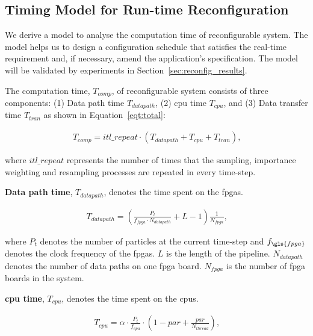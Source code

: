 \subsection{Timing Model for Run-time Reconfiguration}
\label{sec:reconfig_reconfig}

We derive a model to analyse the computation time of reconfigurable system.
The model helps us to design a configuration schedule that satisfies the real-time requirement and, if necessary, amend the application's specification.
The model will be validated by experiments in Section~\ref{sec:reconfig_results}.

The computation time, $T_{comp}$, of reconfigurable system consists of three components: (1) Data path time $T_{datapath}$, (2) \gls{cpu} time $T_{cpu}$, and (3) Data transfer time $T_{tran}$ as shown in Equation~\ref{eqt:total}:

\begin{equation}
\begin{aligned}
T_{comp} = itl\_repeat \cdot \left ( T_{datapath} + T_{cpu} + T_{tran} \right ) \mbox{,}
\end{aligned}
\label{eqt:total}
\end{equation}

where $itl\_repeat$ represents the number of times that the sampling, importance weighting and resampling processes are repeated in every time-step.

\textbf{Data path time}, $T_{datapath}$, denotes the time spent on the \glspl{fpga}.

\begin{equation}
\begin{aligned}
T_{datapath} = \left(\frac{P_t}{f_{fpga} \cdot N_{datapath}} + L - 1 \right) \frac{1}{N_{fpga}} \mbox{,}
\end{aligned}
\label{eqt:kernel}
\end{equation}

where $P_t$ denotes the number of particles at the current time-step and $f_{\gls{fpga}}$ denotes the clock frequency of the \glspl{fpga}.
$L$ is the length of the pipeline.
$N_{datapath}$ denotes the number of data paths on one \gls{fpga} board.
$N_{fpga}$ is the number of \gls{fpga} boards in the system.

\textbf{\gls{cpu} time}, $T_{cpu}$, denotes the time spent on the \glspl{cpu}.

\begin{equation}
\begin{aligned}
T_{cpu} = \alpha \cdot \frac{P_t}{f_{cpu}} \cdot \left(1-par+\frac{par}{N_{thread}}\right) \mbox{,}
\end{aligned}
\label{eqt:host}
\end{equation}

